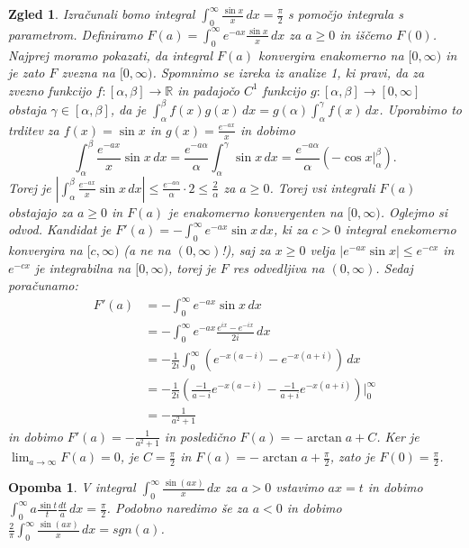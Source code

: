 \documentclass[10pt, a4paper]{article}
\newtheorem*{opomba}{Opomba}
\newtheorem{zgled}{Zgled}[section]
\newcommand{\R}{\mathbb {R}}
\begin{document}
\begin{zgled}
    Izračunali bomo integral $\int_0 ^\infty \frac{\sin x}{x} \, dx = \frac{\pi}{2}$ s pomočjo integrala s parametrom.
    Definiramo $F(a) = \int_0 ^\infty e^{-ax} \frac{\sin x}{x}\, dx$ za $a \geq 0$ in iščemo $F(0)$.
    Najprej moramo pokazati, da integral $F(a)$ konvergira enakomerno na $[0, \infty)$ in je zato $F$ zvezna na $[0, \infty)$.
    Spomnimo se izreka iz analize 1, ki pravi, da za zvezno funkcijo $f: [\alpha, \beta] \to \R$ 
    in padajočo $C^1$ funkcijo $g: [\alpha, \beta] \to [0, \infty]$ obstaja $\gamma \in [\alpha, \beta]$,
    da je $\int_\alpha ^\beta f(x)g(x)\, dx = g(\alpha) \int_\alpha ^\gamma f(x)\, dx$.
    Uporabimo to trditev za $f(x) = \sin x$ in $g(x) = \frac{e^{-ax}}{x}$ in dobimo 
    $$\int_\alpha ^\beta \frac{e^{-ax}}{x} \sin x \, dx = \frac{e^{-a\alpha}}{\alpha} \int_\alpha ^\gamma \sin x \, dx = \frac{e^{-a\alpha}}{\alpha}  (- \cos x \big|_\alpha ^\beta).$$
    Torej je $\left| \int_\alpha ^\beta \frac{e^{-ax}}{x} \sin x \, dx \right| \leq \frac{e^{-a\alpha}}{\alpha} \cdot 2 \leq \frac{2}{\alpha}$ za $a \geq 0$.
    Torej vsi integrali $F(a)$ obstajajo za $a \geq 0$ in $F(a)$ je enakomerno konvergenten na $[0, \infty)$.
    Oglejmo si odvod. Kandidat je $F'(a) = - \int_0 ^\infty e^{-ax} \sin x \, dx$, ki za $c > 0$
    integral enekomerno konvergira na $[c, \infty)$ (a ne na $(0, \infty)$!), saj za $x \geq 0$ velja
    $\left| e^{-ax} \sin x \right| \leq e^{-cx}$ in $e^{-cx}$ je integrabilna na $[0, \infty)$, torej je 
    $F$ res odvedljiva na $(0, \infty)$. Sedaj poračunamo:
    \begin{align*}
        F'(a) &= - \int_0 ^\infty e^{-ax} \sin x \, dx\\
        &= - \int_0 ^\infty e^{-ax} \frac{e^{ix} - e^{-ix}}{2i} \, dx\\
        &= - \frac{1}{2i} \int_0 ^\infty \left(e^{-x(a-i)} - e^{-x(a+i)}\right) \, dx\\
        &= - \frac{1}{2i} \left(\frac{-1}{a - i} e^{-x(a-i)} - \frac{-1}{a + i} e^{-x(a+i)}\right) \Big|_0 ^\infty\\
        &= - \frac{1}{a^2 + 1}
    \end{align*} 
    in dobimo $F'(a) = -\frac{1}{a^2 + 1}$ in posledično $F(a) = - \arctan a + C$.
    Ker je $\lim_{a \to \infty} F(a) = 0$, je $C = \frac{\pi}{2}$ in $F(a) = - \arctan a + \frac{\pi}{2}$,
    zato je $F(0) = \frac{\pi}{2}$.
\end{zgled}

\begin{opomba}
    V integral $\int_0 ^\infty \frac{\sin (ax)}{x}\, dx$ za $a > 0$ vstavimo $ax = t$ in dobimo 
    $\int_0 ^\infty a \frac{\sin t}{t} \frac{dt}{a}\, dx = \frac{\pi}{2}$. Podobno naredimo še za $a < 0$ in dobimo 
    $\frac{2}{\pi} \int_0 ^\infty \frac{\sin (ax)}{x}\, dx = sgn (a)$.
\end{opomba}
\end{document}
